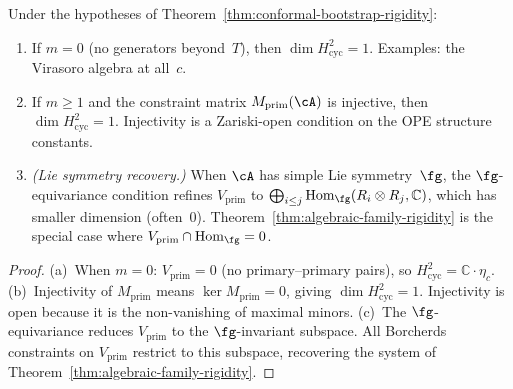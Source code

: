 \begin{corollary}
\label{cor:one-channel-no-lie}
Under the hypotheses of
Theorem~\textup{\ref{thm:conformal-bootstrap-rigidity}}:
\begin{enumerate}[label=\textup{(\alph*)}]
\item If $m = 0$ \textup{(}no generators beyond~$T$\textup{)},
  then $\dim H^2_{\mathrm{cyc}} = 1$.
  Examples: the Virasoro algebra at all~$c$.
\item If $m \geq 1$ and the constraint matrix
  $M_{\mathrm{prim}}(\cA)$ is injective, then
  $\dim H^2_{\mathrm{cyc}} = 1$.  Injectivity is a
  Zariski-open condition on the OPE structure constants.
\item \emph{\textup{(}Lie symmetry recovery.\textup{)}}
  When $\cA$ has simple Lie symmetry~$\fg$, the
  $\fg$-equivariance condition refines
  $V_{\mathrm{prim}}$ to
  $\bigoplus_{i \leq j} \operatorname{Hom}_\fg(R_i \otimes R_j,
  \mathbb{C})$, which has smaller dimension \textup{(}often~$0$\textup{)}.
  Theorem~\textup{\ref{thm:algebraic-family-rigidity}} is the
  special case where $V_{\mathrm{prim}} \cap \operatorname{Hom}_\fg = 0$.
\end{enumerate}
\end{corollary}

\begin{proof}
(a)~When $m = 0$: $V_{\mathrm{prim}} = 0$ (no primary--primary
pairs), so $H^2_{\mathrm{cyc}} = \mathbb{C}\!\cdot\!\eta_c$.
(b)~Injectivity of $M_{\mathrm{prim}}$ means
$\ker M_{\mathrm{prim}} = 0$, giving $\dim H^2_{\mathrm{cyc}} = 1$.
Injectivity is open because it is the non-vanishing of maximal
minors.
(c)~The $\fg$-equivariance reduces
$V_{\mathrm{prim}}$ to the $\fg$-invariant subspace.
All Borcherds constraints on $V_{\mathrm{prim}}$ restrict to this
subspace, recovering the system of
Theorem~\ref{thm:algebraic-family-rigidity}.
\end{proof}

